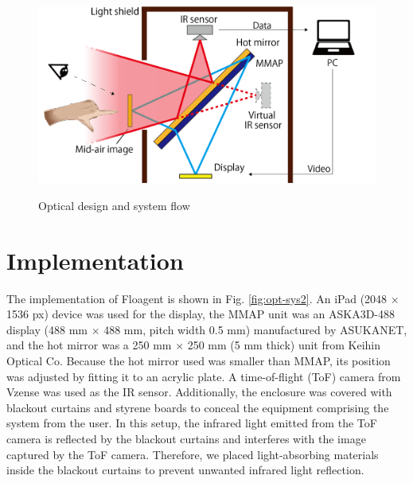 \documentclass[sigconf]{acmart}
\begin{document}
\begin{figure}[bt]
  \begin{center}
    \includegraphics[width=0.9\linewidth]{images/hot-MMAPs_system.png}
    \vspace{-0.8\baselineskip}
    \caption{Optical design and system flow}
    \vspace{-1.5\baselineskip}
    \label{fig:hot-MMAPs}
  \end{center}
\end{figure}

\section{Implementation \label{hard}}

The implementation of Floagent is shown in Fig. \ref{fig:opt-sys2}.
An iPad (2048 $\times$ 1536 px) device was used for the display, the MMAP unit was an ASKA3D-488 display (488 mm $\times$ 488 mm, pitch width 0.5 mm) manufactured by ASUKANET, and the hot mirror was a 250 mm $\times$ 250 mm (5 mm thick) unit from Keihin Optical Co.
Because the hot mirror used was smaller than MMAP, its position was adjusted by fitting it to an acrylic plate.
A time-of-flight (ToF) camera from Vzense was used as the IR sensor.
Additionally, the enclosure was covered with blackout curtains and styrene boards to conceal the equipment comprising the system from the user.
In this setup, the infrared light emitted from the ToF camera is reflected by the blackout curtains and interferes with the image captured by the ToF camera.
Therefore, we placed light-absorbing materials inside the blackout curtains to prevent unwanted infrared light reflection.
\end{document}
